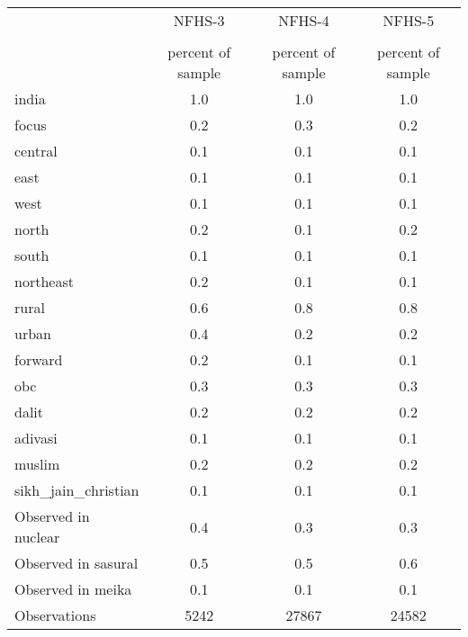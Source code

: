 {
\def\sym#1{\ifmmode^{#1}\else\(^{#1}\)\fi}
\begin{tabular}{l*{3}{c}}
\toprule
                    &      NFHS-3&      NFHS-4&      NFHS-5\\
                    &\multicolumn{1}{c}{}&\multicolumn{1}{c}{}&\multicolumn{1}{c}{}\\
                    &percent of sample&percent of sample&percent of sample\\
\midrule
india               &         1.0&         1.0&         1.0\\
focus               &         0.2&         0.3&         0.2\\
central             &         0.1&         0.1&         0.1\\
east                &         0.1&         0.1&         0.1\\
west                &         0.1&         0.1&         0.1\\
north               &         0.2&         0.1&         0.2\\
south               &         0.1&         0.1&         0.1\\
northeast           &         0.2&         0.1&         0.1\\
rural               &         0.6&         0.8&         0.8\\
urban               &         0.4&         0.2&         0.2\\
forward             &         0.2&         0.1&         0.1\\
obc                 &         0.3&         0.3&         0.3\\
dalit               &         0.2&         0.2&         0.2\\
adivasi             &         0.1&         0.1&         0.1\\
muslim              &         0.2&         0.2&         0.2\\
sikh\_jain\_christian &         0.1&         0.1&         0.1\\
Observed in nuclear &         0.4&         0.3&         0.3\\
Observed in sasural &         0.5&         0.5&         0.6\\
Observed in meika   &         0.1&         0.1&         0.1\\
\midrule
Observations        &        5242&       27867&       24582\\
\bottomrule
\end{tabular}
}
